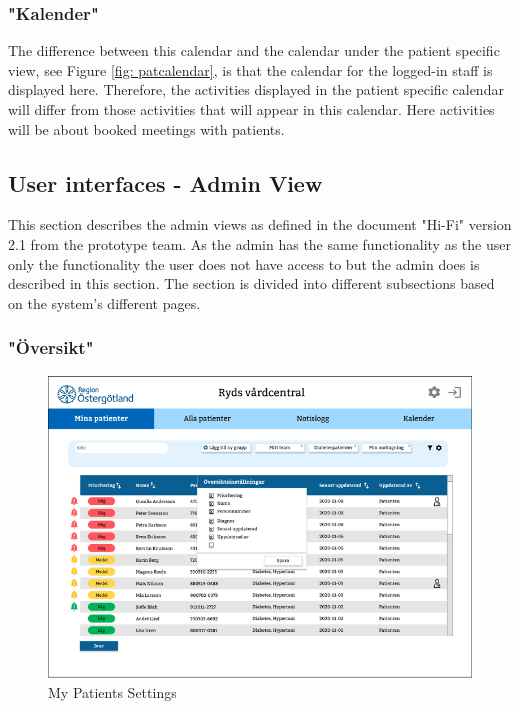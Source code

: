 \documentclass{scrreprt}
\begin{document}
\subsubsection{"Kalender"}
The difference between this calendar and the calendar under the patient specific view, see Figure \ref{fig: patcalendar}, is that the calendar for the logged-in staff is displayed here. Therefore, the activities displayed in the patient specific calendar will differ from those activities that will appear in this calendar. Here activities will be about booked meetings with patients. 

\subsection{User interfaces -  Admin View}
\label{section: admin}
This section describes the admin views as defined in the document "Hi-Fi" version 2.1 from the prototype team. As the admin has the same functionality as the user only the functionality the user does not have access to but the admin does is described in this section. The section is divided into different subsections based on the system's different pages.

\subsubsection{"Översikt"}
\begin{figure}[h!]
    \centering
    \includegraphics[width=15cm]{mypatsettings.png}
    \caption{My Patients Settings}
    \label{fig: mypatsettings}
\end{figure}
\end{document}
